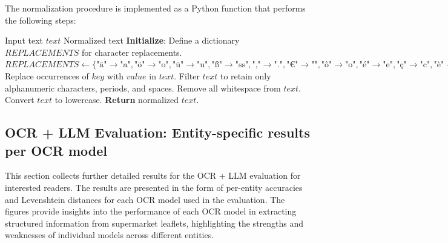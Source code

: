 \documentclass[11pt]{article}
\begin{document}
The normalization procedure is implemented as a Python function that performs the following steps:

\begin{algorithm}[H]
\caption{Text Normalization Procedure}
\label{alg:final_normalization}
\begin{algorithmic}[1]
\Require Input text $text$
\Ensure Normalized text
\State \textbf{Initialize}: Define a dictionary $REPLACEMENTS$ for character replacements.
\State $REPLACEMENTS \gets \{
    \text{"ä"} \rightarrow \text{"a"}, \text{"ö"} \rightarrow \text{"o"}, \text{"ü"} \rightarrow \text{"u"}, 
    \text{"ß"} \rightarrow \text{"ss"}, \text{","} \rightarrow \text{"."}, \text{"€"} \rightarrow \text{""}, 
    \text{"ô"} \rightarrow \text{"o"}, \text{"é"} \rightarrow \text{"e"}, \text{"ç"} \rightarrow \text{"c"}, 
    \text{"è"} \rightarrow \text{"e"}, \text{"à"} \rightarrow \text{"a"}, \text{"ê"} \rightarrow \text{"e"}, 
    \text{"â"} \rightarrow \text{"a"}, \text{"û"} \rightarrow \text{"u"}, \text{"î"} \rightarrow \text{"i"}, 
    \text{"ë"} \rightarrow \text{"e"}, \text{"ï"} \rightarrow \text{"i"}, \text{"œ"} \rightarrow \text{"oe"}, 
    \text{"æ"} \rightarrow \text{"ae"}, \text{"ù"} \rightarrow \text{"u"}
\}$
    \State Replace occurrences of $key$ with $value$ in $text$.
\EndFor
\State Filter $text$ to retain only alphanumeric characters, periods, and spaces.
\State Remove all whitespace from $text$.
\State Convert $text$ to lowercase.
\State \textbf{Return} normalized $text$.
\end{algorithmic}
\end{algorithm}


\subsection{OCR + LLM Evaluation: Entity-specific results per OCR model}
\label{app:ocr_llm_results}

This section collects further detailed results for the OCR + LLM evaluation for interested readers. The results are presented in the form of per-entity accuracies and Levenshtein distances for each OCR model used in the evaluation. The figures provide insights into the performance of each OCR model in extracting structured information from supermarket leaflets, highlighting the strengths and weaknesses of individual models across different entities.
\end{document}
